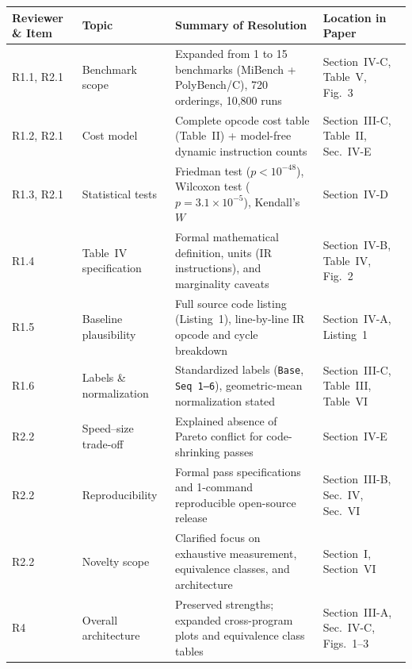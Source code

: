 \documentclass[10pt,a4paper]{article}
\begin{document}
\begin{table}[htbp]
\centering
\small
\renewcommand{\arraystretch}{1.1}
\begin{tabularx}{\textwidth}{@{}llXl@{}}
\toprule
\textbf{Reviewer \& Item} & \textbf{Topic} & \textbf{Summary of Resolution} & \textbf{Location in Paper} \\
\midrule
R1.1, R2.1 & Benchmark scope & Expanded from 1 to 15 benchmarks (MiBench + PolyBench/C), 720 orderings, 10,800 runs & Section~IV-C, Table~V, Fig.~3 \\
R1.2, R2.1 & Cost model & Complete opcode cost table (Table~II) + model-free dynamic instruction counts & Section~III-C, Table~II, Sec.~IV-E \\
R1.3, R2.1 & Statistical tests & Friedman test ($p < 10^{-48}$), Wilcoxon test ($p = 3.1 \times 10^{-5}$), Kendall's $W$ & Section~IV-D \\
R1.4 & Table~IV specification & Formal mathematical definition, units (IR instructions), and marginality caveats & Section~IV-B, Table~IV, Fig.~2 \\
R1.5 & Baseline plausibility & Full source code listing (Listing~1), line-by-line IR opcode and cycle breakdown & Section~IV-A, Listing~1 \\
R1.6 & Labels \& normalization & Standardized labels (\texttt{Base}, \texttt{Seq 1--6}), geometric-mean normalization stated & Section~III-C, Table~III, Table~VI \\
R2.2 & Speed--size trade-off & Explained absence of Pareto conflict for code-shrinking passes & Section~IV-E \\
R2.2 & Reproducibility & Formal pass specifications and 1-command reproducible open-source release & Section~III-B, Sec.~IV, Sec.~VI \\
R2.2 & Novelty scope & Clarified focus on exhaustive measurement, equivalence classes, and architecture & Section~I, Section~VI \\
R4 & Overall architecture & Preserved strengths; expanded cross-program plots and equivalence class tables & Section~III-A, Sec.~IV-C, Figs.~1--3 \\
\bottomrule
\end{tabularx}
\end{table}
\end{document}

